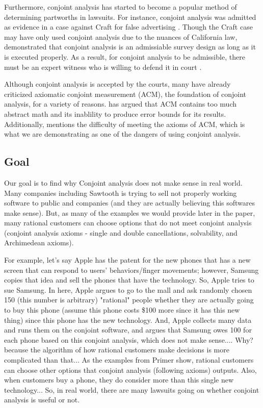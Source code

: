 \documentclass[12pt]{article}
\begin{document}
Furthermore, conjoint analysis has started to become a popular method of determining partworths in lawsuits. For instance, conjoint analysis was admitted as evidence in a case against Craft for false advertising \citep{tushnet_court_2017}. Though the Craft case may have only used conjoint analysis due to the nuances of California law, \citet{sidak_using_2016} demonstrated that conjoint analysis is an admissiable survey design as long as it is executed properly. As a result, for conjoint analysis to be admissible, there must be an expert witness who is willing to defend it in court \citep{korczyk_when_2018}. 


Although conjoint analysis is accepted by the courts, many have already criticized axiomatic conjoint measurement (ACM), the foundation of conjoint analysis, for a variety of reasons. \citet{cliff_article_1992} has argued that ACM contains too much abstract math and its inablility to produce error bounds for its results. Additionally, \citet{heene_additive_2013} mentions the difficulty of meeting the axioms of ACM, which is what we are demonstrating as one of the dangers of using conjoint analysis.

\subsection{Goal}
Our goal is to find why Conjoint analysis does not make sense in real world. Many companies including Sawtooth is trying to sell not properly working software to public and companies (and they are actually believing this softwares make sense). But, as many of the examples we would provide later in the paper, many rational customers can choose options that do not meet conjoint analysis (conjoint analysis axioms - single and double cancellations, solvability, and Archimedean axioms). 


For example, let's say Apple has the patent for the new phones that has a new screen that can respond to users' behaviors/finger movements; however, Samsung copies that idea and sell the phones that have the technology. So, Apple tries to sue Samsung. In here, Apple argues to go to the mall and ask randomly chosen 150 (this number is arbitrary) "rational" people whether they are actually going to buy this phone (assume this phone costs \$100 more since it has this new thing) since this phone has the new technology. And, Apple collects many data and runs them on the conjoint software, and argues that Samsung owes 100 for each phone based on this conjoint analysis, which does not make sense.... Why? because the algorithm of how rational customers make decisions is more complicated than that... As the examples from Primer show, rational customers can choose other options that conjoint analysis (following axioms) outputs. Also, when customers buy a phone, they do consider more than this single new technology... So, in real world, there are many lawsuits going on whether conjoint analysis is useful or not.
\end{document}
